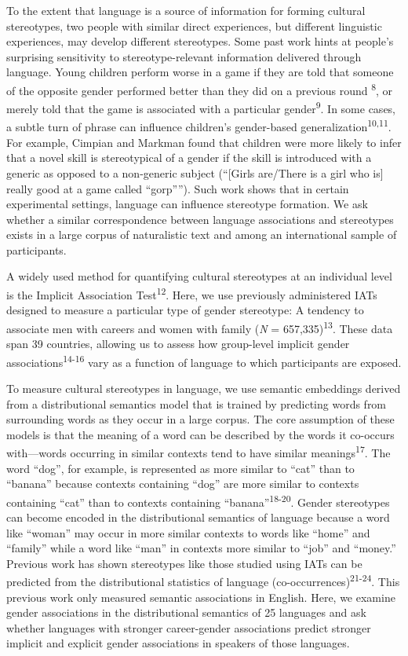 \documentclass[9pt,twocolumn]{pnas-new}
\begin{document}
To the extent that language is a source of information for forming
cultural stereotypes, two people with similar direct experiences, but
different linguistic experiences, may develop different stereotypes.
Some past work hints at people's surprising sensitivity to
stereotype-relevant information delivered through language. Young
children perform worse in a game if they are told that someone of the
opposite gender performed better than they did on a previous round
\textsuperscript{8}, or merely told that the game is associated
with a particular gender\textsuperscript{9}. In some
cases, a subtle turn of phrase can influence children's gender-based
generalization\textsuperscript{10,11}. For example, Cimpian and Markman found that children were more likely to infer that a novel skill is stereotypical of a
gender if the skill is introduced with a generic as opposed to a
non-generic subject (``{[}Girls are/There is a girl who is{]} really
good at a game called ``gorp''''). Such work shows that in certain
experimental settings, language can influence stereotype formation. We ask whether a similar correspondence between language associations and stereotypes exists in a large corpus of naturalistic text and among an international sample of participants. 

A widely used method for quantifying cultural stereotypes at an
individual level is the Implicit Association Test\textsuperscript{12}. Here, we use previously administered IATs designed to measure a particular type of gender
stereotype: A tendency to associate men with careers and women with family
(\emph{N} = 657,335)\textsuperscript{13}. These data span 39 countries, allowing us to assess how group-level implicit gender associations\textsuperscript{14-16} vary as a function of language to which participants are exposed. 

To measure cultural stereotypes in language, we use semantic embeddings derived from a distributional semantics model that is trained by predicting words from surrounding words as they occur in a large corpus. The core assumption of these models is that the meaning of a word can be described by the words it co-occurs with---words occurring in similar contexts tend to have similar meanings\textsuperscript{17}. The word \enquote{dog}, for example, is represented as more similar to \enquote{cat} than to \enquote{banana} because contexts containing \enquote{dog} are more similar to contexts containing \enquote{cat} than to contexts containing \enquote{banana}\textsuperscript{18-20}. Gender stereotypes can become encoded in the distributional semantics of language because a word like \enquote{woman} may occur in more similar contexts to words like \enquote{home} and \enquote{family} while a word like \enquote{man} in contexts more similar to \enquote{job} and \enquote{money.} Previous work has shown stereotypes like those studied using IATs can be predicted from the distributional statistics of language (co-occurrences)\textsuperscript{21-24}. This previous work only measured semantic associations in English. Here, we examine gender associations in the distributional semantics of 25 languages and ask whether languages with stronger career-gender associations predict stronger implicit and explicit gender associations in speakers of those languages.
\end{document}
